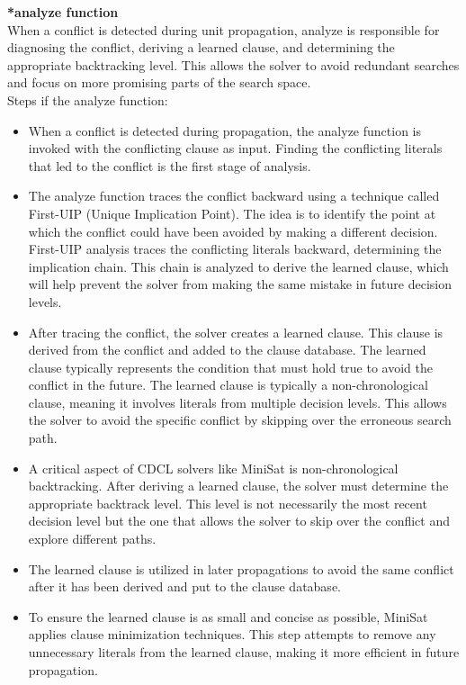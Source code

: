 \documentclass[runningheads]{llncs}
\begin{document}
\textbf{*analyze function}
\\
When a conflict is detected during unit propagation, analyze is responsible for diagnosing the conflict, deriving a learned clause, and determining the appropriate backtracking level. This allows the solver to avoid redundant searches and focus on more promising parts of the search space. 
\\
Steps if the analyze function:
\begin{itemize}
    \item When a conflict is detected during propagation, the analyze function is invoked with the conflicting clause as input. Finding the conflicting literals that led to the conflict is the first stage of analysis. 

\item The analyze function traces the conflict backward using a technique called First-UIP (Unique Implication Point). The idea is to identify the point at which the conflict could have been avoided by making a different decision.
First-UIP analysis traces the conflicting literals backward, determining the implication chain. This chain is analyzed to derive the learned clause, which will help prevent the solver from making the same mistake in future decision levels.

\item After tracing the conflict, the solver creates a learned clause. This clause is derived from the conflict and added to the clause database. The learned clause typically represents the condition that must hold true to avoid the conflict in the future.
The learned clause is typically a non-chronological clause, meaning it involves literals from multiple decision levels. This allows the solver to avoid the specific conflict by skipping over the erroneous search path.


\item A critical aspect of CDCL solvers like MiniSat is non-chronological backtracking. After deriving a learned clause, the solver must determine the appropriate backtrack level. This level is not necessarily the most recent decision level but the one that allows the solver to skip over the conflict and explore different paths. 

\item The learned clause is utilized in later propagations to avoid the same conflict after it has been derived and put to the clause database. 

\item To ensure the learned clause is as small and concise as possible, MiniSat applies clause minimization techniques. This step attempts to remove any unnecessary literals from the learned clause, making it more efficient in future propagation.
\end{itemize}
\end{document}
